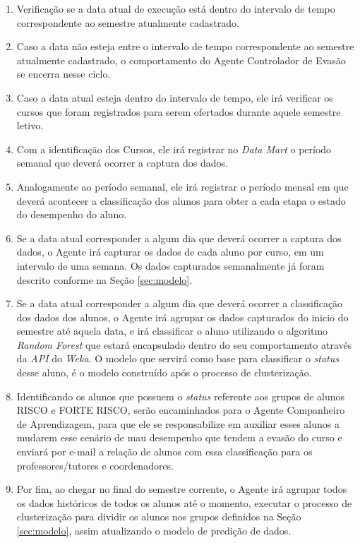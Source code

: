 \begin{enumerate}
\item Verificação se a data atual de execução está dentro do intervalo de tempo correspondente ao semestre atualmente cadastrado.
\item Caso a data não esteja entre o intervalo de tempo correspondente ao semestre atualmente cadastrado, o comportamento do Agente Controlador de Evasão se encerra nesse ciclo.
\item Caso a data atual esteja dentro do intervalo de tempo, ele irá verificar os cursos que foram registrados para serem ofertados durante aquele semestre letivo.
\item Com a identificação dos Cursos, ele irá registrar no \textit{Data Mart} o período semanal que deverá ocorrer a captura dos dados.
\item Analogamente ao período semanal, ele irá registrar o período mensal em que deverá acontecer a classificação dos alunos para obter a cada etapa o estado do desempenho do aluno.
\item Se a data atual corresponder a algum dia que deverá ocorrer a captura dos dados, o Agente irá capturar os dados de cada aluno por curso, em um intervalo de uma semana. Os dados capturados semanalmente já foram descrito conforme na Seção \ref{sec:modelo}.
\item Se a data atual corresponder a algum dia que deverá ocorrer a classificação dos dados dos alunos, o Agente irá agrupar os dados capturados do inicio do semestre até aquela data, e irá classificar o aluno utilizando o algoritmo \textit{Random Forest} que estará encapsulado dentro do seu comportamento através da \textit{API} do \textit{Weka}. O modelo que servirá como base para classificar o \textit{status} desse aluno, é o modelo construído após o processo de clusterização.
\item Identificando os alunos que possuem o \textit{status} referente aos grupos de alunos RISCO e FORTE RISCO, serão encaminhados para o Agente Companheiro de Aprendizagem, para que ele se responsabilize em auxiliar esses alunos a mudarem esse cenário de mau desempenho que tendem a evasão do curso e enviará por e-mail a relação de alunos com essa classificação para os professores/tutores e coordenadores.
\item Por fim, ao chegar no final do semestre corrente, o Agente irá agrupar todos os dados históricos de todos os alunos até o momento, executar o processo de clusterização para dividir os alunos nos grupos definidos na Seção \ref{sec:modelo}, assim atualizando o modelo de predição de dados.
\end{enumerate}

